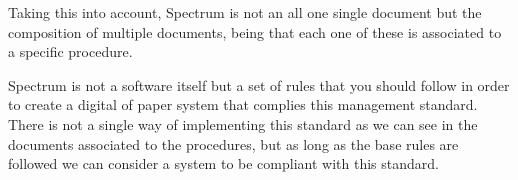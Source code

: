 Taking this into account, Spectrum is not an all one single document but the composition of multiple documents, being that each one of these is associated to a specific procedure.


Spectrum is not a software itself but a set of rules that you should follow in order to create a digital of paper system that complies this management standard. There is not a single way of implementing this standard as we can see in the documents associated to the procedures, but as long as the base rules are followed we can consider a system to be compliant with this standard.